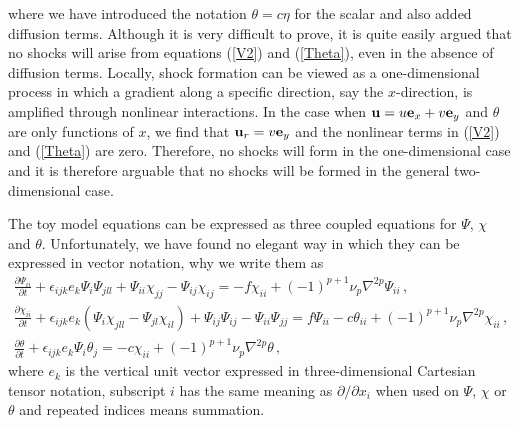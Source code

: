 where we have introduced the notation $ \theta = c \eta $ for the scalar and also added diffusion terms.
Although it is very difficult to prove, it is quite easily argued that no shocks will arise from equations (\ref{V2}) and (\ref{Theta}), even in the absence of diffusion terms.  Locally, shock formation can be viewed as a one-dimensional process in which a gradient along a specific direction, say the $ x $-direction,  is amplified through nonlinear interactions. In the case  when $ {\bf u} = u {\bf e}_x + v {\bf e}_y $  and $ \theta $ are only functions of $ x $, we find that $ {\bf u}_r = v {\bf e}_y $ and the nonlinear terms in (\ref{V2}) and (\ref{Theta}) are zero. Therefore, no shocks will form in the one-dimensional case and it is therefore arguable that no shocks will be formed in the general two-dimensional case.

The toy model equations can be expressed as three coupled equations for $ \Psi $, $ \chi $ and $ \theta $. Unfortunately, we have found no elegant way in which they can be expressed in vector notation, why we write them as
\begin{eqnarray} \label{PsiEq}
\frac{\partial{\Psi_{ii}}}{\partial t} +\epsilon_{ijk}e_k \Psi_i \Psi_{jll} + \Psi_{ii} \chi_{jj} - \Psi_{ij} \chi_{ij} = -f \chi_{ii} + (-1)^{p+1} \nu_p \nabla^{2p} \Psi_{ii} \, , \\ \label{ChiEq}
\frac{\partial{\chi_{ii}}}{\partial t} +\epsilon_{ijk}e_k (\Psi_i \chi_{jll} - \Psi_{jl} \chi_{il}) + \Psi_{ij} \Psi_{ij} - \Psi_{ii} \Psi_{jj} =  f \Psi_{ii} - c \theta_{ii} + (-1)^{p+1} \nu_p \nabla^{2p} \chi_{ii} \, , \\ \label{ThetaEq}
\frac{\partial{\theta}}{\partial t} + \epsilon_{ijk}e_k \Psi_i \theta_{j} = - c \chi_{ii} + (-1)^{p+1} \nu_p \nabla^{2p} \theta \, ,
\end{eqnarray}
where $ e_k $ is the vertical unit vector expressed in three-dimensional Cartesian tensor notation,  subscript $ i $  has the same meaning as $ {\partial }/{\partial x_i }$ when used on $ \Psi $,  $ \chi $ or $ \theta $ and repeated indices means summation.


